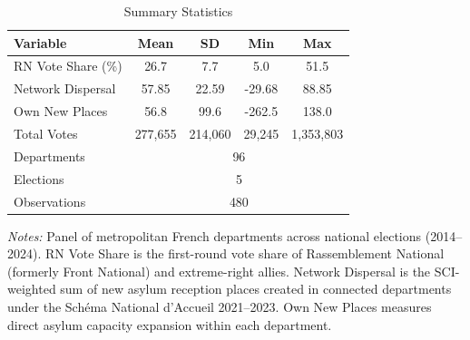 \begin{table}[htbp]
\centering
\caption{Summary Statistics}
\label{tab:sumstats}
\begin{tabular}{lcccc}
\toprule
Variable & Mean & SD & Min & Max \\
\midrule
RN Vote Share (\%) & 26.7 & 7.7 & 5.0 & 51.5 \\
Network Dispersal & 57.85 & 22.59 & -29.68 & 88.85 \\
Own New Places & 56.8 & 99.6 & -262.5 & 138.0 \\
Total Votes & 277,655 & 214,060 & 29,245 & 1,353,803 \\
\midrule
Departments & \multicolumn{4}{c}{96} \\
Elections & \multicolumn{4}{c}{5} \\
Observations & \multicolumn{4}{c}{480} \\
\bottomrule
\end{tabular}
\begin{minipage}{0.95\textwidth}
\small\textit{Notes:} Panel of metropolitan French departments across national elections (2014--2024). RN Vote Share is the first-round vote share of Rassemblement National (formerly Front National) and extreme-right allies. Network Dispersal is the SCI-weighted sum of new asylum reception places created in connected departments under the Sch\'ema National d'Accueil 2021--2023. Own New Places measures direct asylum capacity expansion within each department.
\end{minipage}
\end{table}
